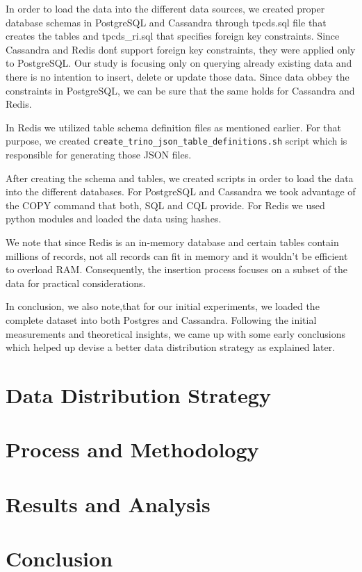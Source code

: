 \documentclass[conference]{IEEEtran}
\begin{document}
In order to load the data into the different data sources, we created proper database schemas in PostgreSQL and Cassandra through 
tpcds.sql file that creates the tables and tpcds\_ri.sql that specifies foreign key constraints. Since Cassandra and Redis don\'t support foreign key constraints, they were applied only to PostgreSQL. Our 
study is focusing only on querying already existing data and there is no intention to insert, delete or update those data. Since data obbey the constraints in PostgreSQL, we can be sure that the same holds
for Cassandra and Redis.

In Redis we utilized table schema definition files as mentioned earlier. For that purpose, we created \texttt{create\_trino\_json\_table\_definitions.sh} script which is responsible for generating those JSON files.

After creating the schema and tables, we created scripts in order to load the data into the different databases. For PostgreSQL and Cassandra we took advantage of the COPY command that both, SQL and CQL provide.
For Redis we used python modules and loaded the data using hashes.

We note that since Redis is an in-memory database and certain tables contain millions of records, not all records can fit in memory and it wouldn't be efficient to overload RAM. Consequently, the insertion process
focuses on a subset of the data for practical considerations.

In conclusion, we also note,that for our initial experiments, we loaded the complete dataset into both Postgres and Cassandra. Following the initial measurements and theoretical insights, we came up with some early conclusions 
which helped up devise a better data distribution strategy as explained later.

\section{Data Distribution Strategy}
\section{Process and Methodology}
\section{Results and Analysis}
\section{Conclusion}
\end{document}
